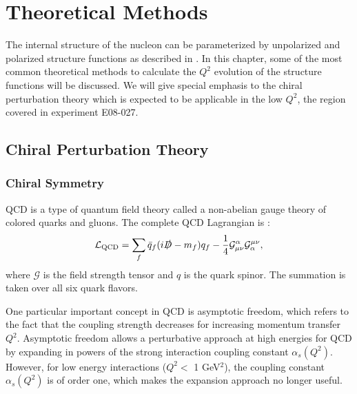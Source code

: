 
\chapter{Theoretical Methods}
\label{C3}

The internal structure of the nucleon can be parameterized by unpolarized and polarized structure functions as described in . In this chapter, some of the most common theoretical methods to calculate the $Q^2$ evolution of the structure functions will be discussed. We will give special emphasis to the chiral perturbation theory which is expected to be applicable in the low $Q^2$, the region covered in experiment E08-027.

\section{Chiral Perturbation Theory}
\label{C3S1}

\subsection{Chiral Symmetry}
\label{C3S1SS1}

QCD is a type of quantum field theory called a non-abelian gauge theory of colored quarks and gluons. The complete QCD Lagrangian is \cite{Marciano1978}:
\begin{equation} \label{C3S1E1}
\mathcal{L}_{\mathrm{QCD}} = \sum_f\bar{q}_f(i\slashed{D}-m_f)q_f-\frac{1}{4}\mathcal{G}_{\mu\nu}^\alpha\mathcal{G}_\alpha^{\mu\nu},
\end{equation}
where $\mathcal{G}$ is the field strength tensor and $q$ is the quark spinor. The summation is taken over all six quark flavors.

One particular important concept in QCD is asymptotic freedom, which refers to the fact that the coupling strength decreases for increasing momentum transfer $Q^2$. Asymptotic freedom allows a perturbative approach at high energies for QCD by expanding in powers of the strong interaction coupling constant $\alpha_s(Q^2)$. However, for low energy interactions ($Q^2 <$ 1 GeV${}^2$), the coupling constant $\alpha_s(Q^2)$ is of order one, which makes the expansion approach no longer useful.

